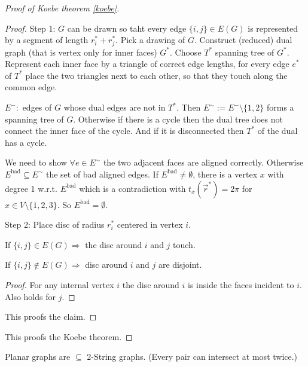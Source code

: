 \begin{proof}[Proof of Koebe theorem \ref{koebe}]
	\begin{proof}
		Step 1: $G$ can be drawn so taht every edge $\{i,j\} \in E(G)$ is represented by a segment of length $r_i^\ast + r_j^\ast$. Pick a drawing of $G$. Construct (reduced) dual graph (that is vertex only for inner faces) $G^\ast$. Choose $T^\ast$ spanning tree of $G^\ast$. Represent each inner face by a triangle of correct edge lengths, for every edge $e^\ast$ of $T^\ast$ place the two triangles next to each other, so that they touch along the common edge.
		
		$E^-:$ edges of $G$ whose dual edges are not in $T^\ast$. Then $E^\sim := E^- \setminus \{1,2\}$ forms a spanning tree of $G$. Otherwise if there is a cycle then the dual tree does not connect the inner face of the cycle. And if it is disconnected then $T^\ast$ of the dual has a cycle.
		
		We need to show $\forall e \in E^\sim$ the two adjacent faces are aligned correctly. Otherwise $E^\text{bad} \subseteq E^\sim$ the set of bad aligned edges. If $E^\text{bad} \neq \emptyset$, there is a vertex $x$ with degree 1 w.r.t. $E^\text{bad}$ which is a contradiction with $t_x(\overrightarrow{r}^\ast) = 2\pi$ for $x \in V \setminus \{1,2,3\}$. So $E^\text{bad} = \emptyset$.
		
		Step 2: Place disc of radius $r_i^\ast$ centered in vertex $i$.
		
		\begin{observ}
			If $\{i,j\} \in E(G) \Rightarrow$ the disc around $i$ and $j$ touch.
		\end{observ}
	
		\begin{lemma}
			If $\{i,j\} \notin E(G) \Rightarrow$ disc around $i$ and $j$ are disjoint.
		\end{lemma}
	
		\begin{proof}
			For any internal vertex $i$ the disc around $i$ is inside the faces incident to $i$. Also holds for $j$.
		\end{proof}
	
		\noindent This proofs the claim.
	\end{proof}

	\noindent This proofs the Koebe theorem.
 \end{proof}

\begin{observ}
	Planar graphs are $\subseteq$ 2-String graphs. (Every pair can intersect at most twice.)
\end{observ}

